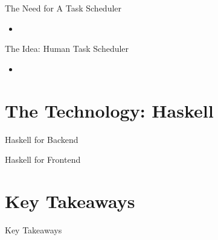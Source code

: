 \documentclass{beamer}
\begin{document}
\begin{frame}{The Need for A Task Scheduler}
    \begin{itemize}
        \item 
    \end{itemize}
\end{frame}

\begin{frame}{The Idea: Human Task Scheduler}
    \begin{itemize}
        \item 
    \end{itemize}
\end{frame}

\section{The Technology: Haskell}

\begin{frame}{Haskell for Backend}
    
\end{frame}

\begin{frame}{Haskell for Frontend}
    
\end{frame}

\section{Key Takeaways}

\begin{frame}{Key Takeaways}
    
\end{frame}
\end{document}
